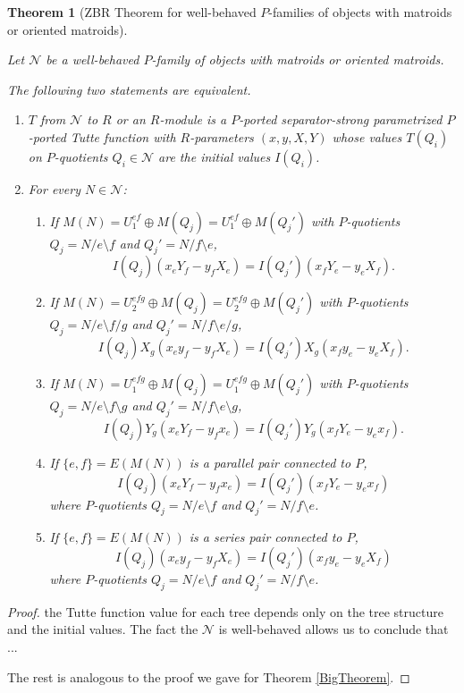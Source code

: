 \documentclass[12pt,leqno]{amsart}
\newtheorem{thm}[lem]{Theorem}
\theoremstyle{remark}
\begin{document}
\begin{thm}[ZBR Theorem for well-behaved 
$P$-families of objects with matroids or
oriented matroids]
\label{ZBRWellBehaved}

Let $\mathcal{N}$ be a well-behaved 
$P$-family of objects with matroids or oriented
matroids.

The following two statements are equivalent.
\begin{enumerate}
\item $T$ from $\mathcal{N}$ to $R$ or an $R$-module is a $P$-ported 
separator-strong parametrized
$P$-ported Tutte function with $R$-parameters $(x, y, X, Y)$ whose values 
$T(Q_i)$ on $P$-quotients $Q_i\in\mathcal{N}$ are the initial
values $I(Q_i)$.
\item
For every $N\in\mathcal{N}$:
\begin{enumerate}
\item 
If $M(N)=U^{ef}_1\oplus M(Q_j)=U^{ef}_1\oplus M(Q_j')$ with 
$P$-quotients $Q_j=N/e\setminus f$ and $Q_j'=N/f\setminus e$,
\[
I(Q_j)(x_e Y_f - y_f X_e ) = 
I(Q_j')(x_f Y_e - y_e X_f).
\]
\item
If $M(N)=U^{efg}_2\oplus M(Q_j)=U^{efg}_2\oplus M(Q_j')$ with 
$P$-quotients $Q_j=N/e\setminus f/g$ 
and $Q_j'=N/f\setminus e/g$,
\[
I(Q_j)X_g(x_e y_f - y_f X_e ) = 
I(Q_j')X_g(x_f y_e - y_e X_f ).
\]
\item
If $M(N)=U^{efg}_1\oplus M(Q_j)=U^{efg}_1\oplus M(Q_j')$ with 
$P$-quotients $Q_j=N/e\setminus f\setminus g$  
and $Q_j'=N/f\setminus e\setminus g$,
\[
I(Q_j)Y_g(x_e Y_f - y_f x_e) = 
I(Q_j')Y_g(x_f Y_e - y_e x_f).
\]
\item
If $\{e,f\}=E(M(N))$ is a parallel pair connected to $P$, 
\[
I(Q_j)(x_e Y_f - y_f x_e) = 
I(Q_j')(x_f Y_e - y_e x_f)
\]
where $P$-quotients $Q_j=N/e\setminus f$
and $Q_j'=N/f\setminus e$.
\item
If $\{e,f\}=E(M(N))$ is a series pair connected to $P$, 
\[
I(Q_j)(x_e y_f - y_f X_e) = 
I(Q_j')(x_f y_e - y_e X_f)
\]
where $P$-quotients
$Q_j=N/e\setminus f$ 
and $Q_j'=N/f\setminus e$.
\end{enumerate}
\end{enumerate}
\end{thm}

\begin{proof}
the Tutte function value 
for each tree depends only on the tree structure and the
initial values.
The fact the $\mathcal{N}$ is well-behaved
allows us to conclude that ...

The rest is analogous to the proof we gave for Theorem \ref{BigTheorem}.
\end{proof}
\end{document}
